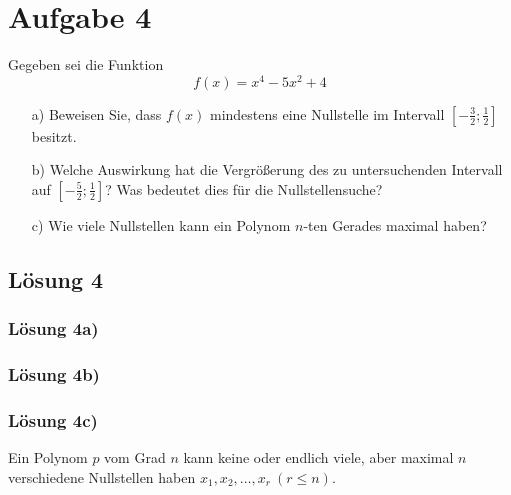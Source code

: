\documentclass[main.tex]{subfiles}
\begin{document}
\section{Aufgabe 4}
Gegeben sei die Funktion
\begin{equation*}
    f(x) =x^{4} -5x^{2} + 4
\end{equation*}

\begin{enumerate}
    \item[a)] Beweisen Sie, dass $f(x)$ mindestens eine Nullstelle im Intervall $\left[ -\frac{3}{2} ;\frac{1}{2}\right]$ besitzt.
    \item[b)] Welche Auswirkung hat die Vergrößerung des zu untersuchenden Intervall auf $\left[ -\frac{5}{2} ;\frac{1}{2}\right]$? Was bedeutet dies für die Nullstellensuche?
    \item[c)] Wie viele Nullstellen kann ein Polynom $n$-ten Gerades maximal haben?
\end{enumerate}

\subsection{Lösung 4}
\subsubsection{Lösung 4a)}
\subsubsection{Lösung 4b)}
\subsubsection{Lösung 4c)}
Ein Polynom $p$ vom Grad $n$ kann keine oder endlich viele, aber maximal $n$ verschiedene Nullstellen haben $x_1,x_2,\ldots, x_r\ (r \leq n)$.
\end{document}
